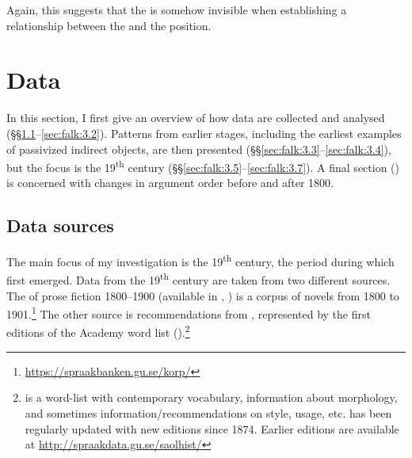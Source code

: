 \documentclass[output=paper]{langscibook}
\begin{document}
\ea%
    \label{ex:falk:7}

\z
\z

Again, this suggests that the  is somehow invisible when establishing a relationship between the  and the  position.

\section{Data}\label{sec:falk:3}


In this section, I first give an overview of how data are collected and analysed (§§\ref{sec:falk:3.1}--\ref{sec:falk:3.2}). Patterns from earlier stages, including the earliest examples of passivized indirect objects, are then presented (§§\ref{sec:falk:3.3}--\ref{sec:falk:3.4}), but the focus is the 19\textsuperscript{th} century (§§\ref{sec:falk:3.5}--\ref{sec:falk:3.7}). A final section () is concerned with changes in argument order before and after 1800.

\subsection{Data sources}
\label{sec:falk:3.1}

The main focus of my investigation is the 19\textsuperscript{th} century, the period during which  first emerged. Data from the 19\textsuperscript{th} century are taken from two different sources. The  of  prose fiction 1800–1900 (available in , \citealt{BorinEtAl2012}) is a corpus of novels from 1800 to 1901.\footnote{\url{https://spraakbanken.gu.se/korp/}}  The other source is recommendations from , represented by the first editions of the  Academy word list ().\footnote{ is a word-list with contemporary vocabulary, information about morphology, and sometimes information/recommendations on style, usage, etc.  has been regularly updated with new editions since 1874. Earlier editions are available at \url{http://spraakdata.gu.se/saolhist/}{} }
\end{document}
